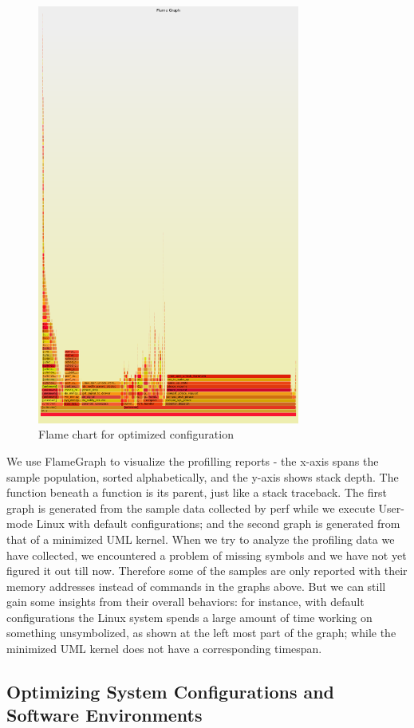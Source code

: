 \begin{figure}[!htb]
\centering
\includegraphics[width=3.4in]{1.png}
\caption{\label{fig:flame1}Flame chart for optimized configuration}
\end{figure}

We use FlameGraph to visualize the profilling reports - the x-axis spans the sample population, sorted alphabetically, and the y-axis shows stack depth. The function beneath a function is its parent, just like a stack traceback. The first graph is generated from the sample data collected by perf while we execute User-mode Linux with default configurations; and the second graph is generated from that of a minimized UML kernel. When we try to analyze the profiling data we have collected, we encountered a problem of missing symbols and we have not yet figured it out till now. Therefore some of the samples are only reported with their memory addresses instead of commands in the graphs above. But we can still gain some insights from their overall behaviors: for instance, with default configurations the Linux system spends a large amount of time working on something unsymbolized, as shown at the left most part of the graph; while the minimized UML kernel does not have a corresponding timespan. 

\subsection{Optimizing System Configurations and Software Environments}

